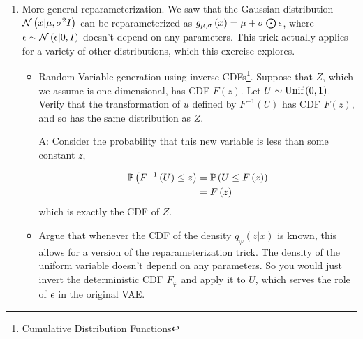 \documentclass{article}
\begin{document}
\begin{enumerate}

\item More general reparameterization. We saw that the Gaussian distribution
$\mathcal{N}\left(x \vert \mu, \sigma^2 I\right)$ can be reparameterized as $g_{\mu,
  \sigma}\left(x\right) = \mu + \sigma \bigodot \epsilon$, where $\epsilon \sim
\mathcal{N}\left(\epsilon \vert 0, I\right)$ doesn't depend on any parameters. This trick
actually applies for a variety of other distributions, which this exercise
explores.
\begin{itemize}
\item Random Variable generation using inverse CDFs\footnote{Cumulative Distribution Functions}. Suppose
  that $Z$, which we assume is one-dimensional, has CDF $F\left(z\right)$. Let
  $U \sim \textnormal{Unif}\left(0, 1\right)$. Verify that the transformation of $u$ defined
  by $F^{-1}\left(U\right)$ has CDF $F\left(z\right)$, and so has the same
  distribution as $Z$.

  A: Consider the probability that this new variable is less than some constant
  $z$,

  \begin{align*}
    \mathbb{P}\left({F^{-1}\left(U\right) \leq z}\right) &= \mathbb{P}\left({U \leq F\left(z\right)}\right) \\
    &= F\left(z\right)
  \end{align*}
  which is exactly the CDF of $Z$.
\item Argue that whenever the CDF of the density $q_{\varphi}\left(z \vert
  x\right)$ is known, this allows for a version of the reparameterization trick.
  The density of the uniform variable doesn't depend on any parameters. So you
  would just invert the deterministic CDF $F_{\varphi}$ and apply it to $U$,
  which serves the role of $\epsilon$ in the original VAE.


\end{itemize}
\end{enumerate}
\end{document}
